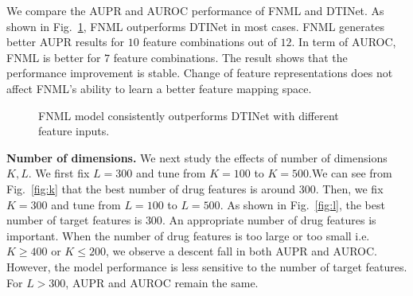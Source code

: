 \documentclass[journal]{IEEEtran}
\begin{document}
We compare the AUPR and AUROC performance of FNML and DTINet. As shown in Fig.~\ref{fig:stability}, FNML outperforms DTINet in most cases. FNML generates better AUPR results for $10$ feature combinations out of $12$. In term of AUROC, FNML is better for $7$ feature combinations. The result shows that the performance improvement is stable. Change of feature representations does not affect FNML's ability to learn a better feature mapping space.

\begin{figure}[!ht]
\centering
{}

\caption{FNML model consistently outperforms DTINet with different feature inputs.}\label{fig:stability}
\end{figure}



\textbf{Number of dimensions.}  We next study the effects of number of dimensions $K,L$. We first fix $L=300$ and tune from $K=100$ to $K=500$.We can see from Fig.~\ref{fig:k} that the best number of drug features is around $300$. Then, we fix $K=300$ and tune from $L=100$ to $L=500$. As shown in Fig.~\ref{fig:l}, the best number of target features is $300$. An appropriate number of drug features is important. When the number of drug features is too large or too small i.e. $K\ge400$ or $K\le200$, we observe a descent fall in both AUPR and AUROC. However, the model performance is less sensitive to the number of target features. For $L>300$, AUPR and AUROC remain the same.   
\end{document}
